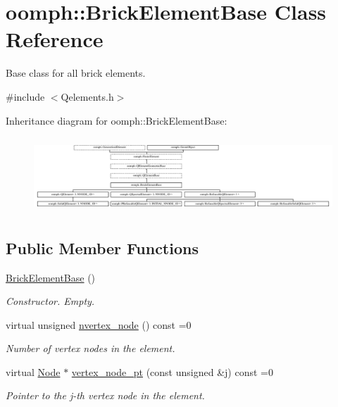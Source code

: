 \hypertarget{classoomph_1_1BrickElementBase}{}\section{oomph\+:\+:Brick\+Element\+Base Class Reference}
\label{classoomph_1_1BrickElementBase}


Base class for all brick elements.  




{\ttfamily \#include $<$Qelements.\+h$>$}

Inheritance diagram for oomph\+:\+:Brick\+Element\+Base\+:\begin{figure}[H]
\begin{center}
\leavevmode
\includegraphics[height=2.873900cm]{classoomph_1_1BrickElementBase}
\end{center}
\end{figure}
\subsection*{Public Member Functions}
\begin{DoxyCompactItemize}
\item 
\hyperlink{classoomph_1_1BrickElementBase_a8c5b0bc251b34533c2be12aaeb212591}{Brick\+Element\+Base} ()
\begin{DoxyCompactList}\small\item\em Constructor. Empty. \end{DoxyCompactList}\item 
virtual unsigned \hyperlink{classoomph_1_1BrickElementBase_a8a2f954fea0650a9641c69614929cfa7}{nvertex\+\_\+node} () const =0
\begin{DoxyCompactList}\small\item\em Number of vertex nodes in the element. \end{DoxyCompactList}\item 
virtual \hyperlink{classoomph_1_1Node}{Node} $\ast$ \hyperlink{classoomph_1_1BrickElementBase_a3b12dfa7761de6719dd66776488b3bf1}{vertex\+\_\+node\+\_\+pt} (const unsigned \&j) const =0
\begin{DoxyCompactList}\small\item\em Pointer to the j-\/th vertex node in the element. \end{DoxyCompactList}\end{DoxyCompactItemize}
